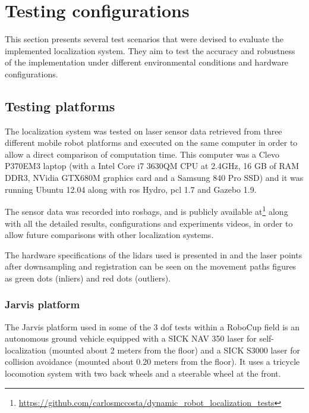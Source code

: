 \section{Testing configurations}\label{sec:testing-configurations}

This section presents several test scenarios that were devised to evaluate the implemented localization system. They aim to test the accuracy and robustness of the implementation under different environmental conditions and hardware configurations.


\subsection{Testing platforms}

The localization system was tested on laser sensor data retrieved from three different mobile robot platforms and executed on the same computer in order to allow a direct comparison of computation time. This computer was a Clevo P370EM3 laptop (with a Intel Core i7 3630QM CPU at 2.4GHz, 16 GB of RAM DDR3, NVidia GTX680M graphics card and a Samsung 840 Pro SSD) and it was running Ubuntu 12.04 along with \gls{ros} Hydro, \gls{pcl} 1.7 and Gazebo 1.9.

The sensor data was recorded into rosbags, and is publicly available at\footnote{\url{https://github.com/carlosmccosta/dynamic_robot_localization_tests}} along with all the detailed results, configurations and experiments videos, in order to allow future comparisons with other localization systems.

The hardware specifications of the \glspl{lidar} used is presented in  and the laser points after downsampling and registration can be seen on the movement paths figures as green dots (inliers) and red dots (outliers).


\subsubsection{Jarvis platform}

The Jarvis platform used in some of the 3 \gls{dof} tests within a RoboCup field is an autonomous ground vehicle equipped with a SICK NAV 350 laser for self-localization (mounted about 2 meters from the floor) and a SICK S3000 laser for collision avoidance (mounted about 0.20 meters from the floor). It uses a tricycle locomotion system with two back wheels and a steerable wheel at the front.

